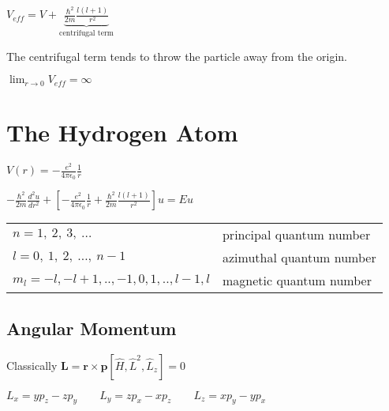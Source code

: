 \documentclass[10pt,a4paper]{scrartcl}
\begin{document}
\begin{multicols*}{3}
	$V_{eff}=V+\underbrace{\frac{\hbar^2}{2m}\frac{l(l+1)}{r^2}}_{\text{centrifugal term}}$
	
	The centrifugal term tends to throw the particle away from the origin. 
	
	$\lim_{r\rightarrow 0}{V_{eff}}=\infty$
	
	\section{The Hydrogen Atom}
	
	$V(r)=-\frac{e^2}{4\pi\epsilon_0}\frac{1}{r}$
	
	$-\frac{\hbar^2}{2m}\frac{d^2u}{dr^2}+\left[-\frac{e^2}{4\pi\epsilon_0}\frac{1}{r}+\frac{\hbar^2}{2m}\frac{l(l+1)}{r^2}\right]u=Eu$
	
	\begin{center}
	
	
	\small
	\normalsize
	
	\end{center}
	
	\footnotesize
	\begin{tabular}{ll}
	$n=1,\ 2,\ 3,\ \dots$&principal quantum number\\
	$l=0,\ 1,\ 2,\ \dots ,\ n-1$&azimuthal quantum number\\
	$m_l=-l, -l+1, .. ,-1,0,1,..,l-1,l$ & magnetic quantum number
	\end{tabular}
	\normalsize
	
	\subsection{Angular Momentum}
	
	Classically $\textbf{L}=\textbf{r}\times\textbf{p}$\hfill $[\hat{H},\hat{L}^2,\hat{L}_z]=0$
	
	$L_x=yp_z-zp_y\qquad L_y=zp_x-xp_z\qquad L_z=xp_y-yp_x$
	

\end{multicols*}
\end{document}

